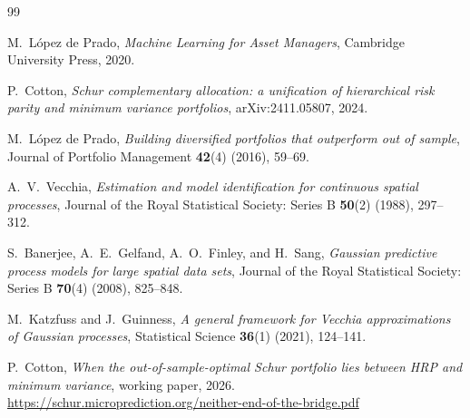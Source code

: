 \documentclass[11pt]{article}
\begin{document}
\begin{thebibliography}{99}

M.~L\'opez de Prado,
\emph{Machine Learning for Asset Managers},
Cambridge University Press, 2020.

P.~Cotton,
\emph{Schur complementary allocation: a unification of hierarchical risk
parity and minimum variance portfolios},
arXiv:2411.05807, 2024.

M.~L\'opez de Prado,
\emph{Building diversified portfolios that outperform out of sample},
Journal of Portfolio Management \textbf{42}(4) (2016), 59--69.

A.~V.~Vecchia,
\emph{Estimation and model identification for continuous spatial processes},
Journal of the Royal Statistical Society: Series B \textbf{50}(2) (1988),
297--312.

S.~Banerjee, A.~E.~Gelfand, A.~O.~Finley, and H.~Sang,
\emph{Gaussian predictive process models for large spatial data sets},
Journal of the Royal Statistical Society: Series B \textbf{70}(4) (2008),
825--848.

M.~Katzfuss and J.~Guinness,
\emph{A general framework for Vecchia approximations of Gaussian processes},
Statistical Science \textbf{36}(1) (2021), 124--141.

P.~Cotton,
\emph{When the out-of-sample-optimal Schur portfolio lies between HRP and
minimum variance}, working paper, 2026.
\url{https://schur.microprediction.org/neither-end-of-the-bridge.pdf}

\end{thebibliography}
\end{document}
